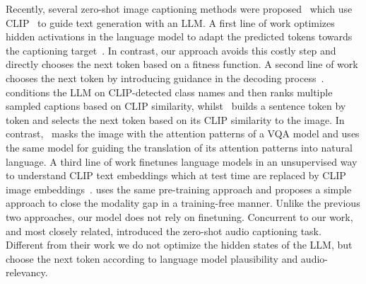 \documentclass{article}
\newcommand{\mypara}[1]{\vspace{2pt}\noindent{\bf{#1}}}
\begin{document}
\mypara{Zero-shot captioning.}
Recently, several zero-shot image captioning methods were proposed~\cite{Su2022LanguageMC,Tewel2021ZeroCapZI,Tewel2022ZeroShotVC,Zeng2022SocraticMC,Wang2022ZeroshotIC} which use CLIP~\cite{Radford2021LearningTV} to guide text generation with an LLM\@.
A first line of work optimizes hidden activations in the language model to adapt the predicted tokens towards the captioning target~\cite{Tewel2021ZeroCapZI,Tewel2022ZeroShotVC}. In contrast, our approach avoids this costly step and directly chooses the next token based on a fitness function.
A second line of work chooses the next token by introducing guidance in the decoding process~\cite{Zeng2022SocraticMC,Su2022LanguageMC}. \cite{Zeng2022SocraticMC} conditions the LLM on CLIP-detected class names and then ranks multiple sampled captions based on CLIP similarity, whilst~\cite{Su2022LanguageMC} builds a sentence token by token and selects the next token based on its CLIP similarity to the image.
In contrast,~\cite{Salewski2023ZeroshotTranslation} masks the image with the attention patterns of a VQA model and uses the same model for guiding the translation of its attention patterns into natural language.
A third line of work finetunes language models in an unsupervised way to understand CLIP text embeddings which at test time are replaced by CLIP image embeddings~\cite{Wang2022ZeroshotIC}. \cite{Li2023DeCapDC} uses the same pre-training approach and proposes a simple approach to close the modality gap in a training-free manner. Unlike the previous two approaches, our model does not rely on finetuning.
Concurrent to our work, and most closely related, \cite{shaharabany2023zero} introduced the zero-shot audio captioning task.
Different from their work we do not optimize the hidden states of the LLM, but choose the next token according to language model plausibility and audio-relevancy.
\end{document}
